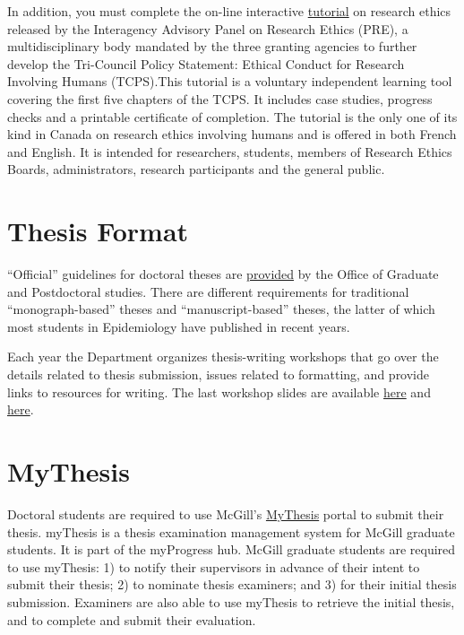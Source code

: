 \documentclass[
  openany]{book}
\begin{document}
In addition, you must complete the on-line interactive \href{http://www.pre.ethics.gc.ca/eng/education/tutorial-didacticiel/}{tutorial} on research ethics released by the Interagency Advisory Panel on Research Ethics (PRE), a multidisciplinary body mandated by the three granting agencies to further develop the Tri-Council Policy Statement: Ethical Conduct for Research Involving Humans (TCPS).This tutorial is a voluntary independent learning tool covering the first five chapters of the TCPS. It includes case studies, progress checks and a printable certificate of completion. The tutorial is the only one of its kind in Canada on research ethics involving humans and is offered in both French and English. It is intended for researchers, students, members of Research Ethics Boards, administrators, research participants and the general public.

\hypertarget{thesis-format}{%
\section{Thesis Format}\label{thesis-format}}

``Official'' guidelines for doctoral theses are \href{https://www.mcgill.ca/gps/thesis/thesis-guidelines/preparation}{provided} by the Office of Graduate and Postdoctoral studies. There are different requirements for traditional ``monograph-based'' theses and ``manuscript-based'' theses, the latter of which most students in Epidemiology have published in recent years.

Each year the Department organizes thesis-writing workshops that go over the details related to thesis submission, issues related to formatting, and provide links to resources for writing. The last workshop slides are available \href{docs/PhD_Epi_Thesis_Writing_Workshop_5Feb2021_KHayden.pptx}{here} and \href{docs/thesis-workshop-PhD-2021-12-03.pdf}{here}.

\hypertarget{mythesis}{%
\section{MyThesis}\label{mythesis}}

Doctoral students are required to use McGill's \href{https://www.mcgill.ca/gps/thesis/thesis-guidelines/initial-submission/what-mythesis}{MyThesis} portal to submit their thesis. myThesis is a thesis examination management system for McGill graduate students. It is part of the myProgress hub. McGill graduate students are required to use myThesis: 1) to notify their supervisors in advance of their intent to submit their thesis; 2) to nominate thesis examiners; and 3) for their initial thesis submission. Examiners are also able to use myThesis to retrieve the initial thesis, and to complete and submit their evaluation.
\end{document}
